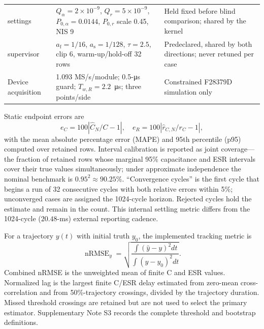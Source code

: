 \begin{table}[t]
\begin{tabular}{p{3.0cm}p{6.0cm}p{6.6cm}}
\TSKF{} settings & $Q_\alpha=2\times10^{-9}$, $Q_r=5\times10^{-9}$, $P_{0,\alpha}=0.0144$, $P_{0,r}$ scale 0.45, NIS 9 & Held fixed before blind comparison; shared by the \TSSRKE{} kernel \\
\TSSRKE{} supervisor & $a_{\mathrm f}=1/16$, $a_{\mathrm s}=1/128$, $\tau=2.5$, clip 6, warm-up/hold-off 32 rows & Predeclared, shared by both directions; never retuned per case \\
Device acquisition & 1.093 MS/s/module; 0.5-\si{\micro\second} guard; $T_{w,R}=2.2$~\si{\micro\second}; three points/side & Constrained F28379D simulation only \\
\bottomrule
\end{tabular}
\end{table}

Static endpoint errors are
\begin{equation}
e_C=100\left|\hat C_N/C-1\right|,\quad
e_R=100\left|\hat r_{C,N}/r_C-1\right|,
\end{equation}
with the mean absolute percentage error (MAPE) and 95th percentile (p95) computed over retained rows. Interval calibration is reported as joint coverage---the fraction of retained rows whose marginal 95\% capacitance and ESR intervals cover their true values simultaneously; under approximate independence the nominal benchmark is $0.95^2\approx90.25\%$. ``Convergence cycles'' is the first cycle that begins a run of 32 consecutive cycles with both relative errors within 5\%; unconverged cases are assigned the 1024-cycle horizon. Rejected cycles hold the estimate and remain in the count. This internal settling metric differs from the 1024-cycle ($20.48$-ms) external reporting cadence.

For a trajectory $y(t)$ with initial truth $y_0$, the implemented tracking metric is
\begin{equation}
\operatorname{nRMSE}_y=
\sqrt{\frac{\int(\hat y-y)^2dt}{\int(y-y_0)^2dt}}.
\end{equation}
Combined nRMSE is the unweighted mean of finite C and ESR values. Normalized lag is the largest finite C/ESR delay estimated from zero-mean cross-correlation and from 50\%-trajectory crossings, divided by the trajectory duration. Missed threshold crossings are retained but are not used to select the primary estimator. Supplementary Note S3 records the complete threshold and bootstrap definitions.





